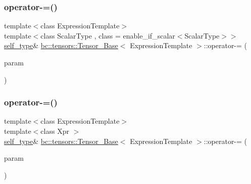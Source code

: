 \mbox{\label{classbc_1_1tensors_1_1Tensor__Base_a6be23674b50827b24c31f65b331ff6af}} 
\subsubsection{\texorpdfstring{operator-\/=()}{operator-=()}\hspace{0.1cm}{\footnotesize\ttfamily [1/2]}}
{\footnotesize\ttfamily template$<$class Expression\+Template$>$ \\
template$<$class Scalar\+Type , class  = enable\+\_\+if\+\_\+scalar$<$\+Scalar\+Type$>$$>$ \\
\hyperlink{classbc_1_1tensors_1_1Expression__Base}{self\+\_\+type}\& \hyperlink{classbc_1_1tensors_1_1Tensor__Base}{bc\+::tensors\+::\+Tensor\+\_\+\+Base}$<$ Expression\+Template $>$\+::operator-\/= (\begin{DoxyParamCaption}\item[{const Scalar\+Type \&}]{param }\end{DoxyParamCaption})\hspace{0.3cm}{\ttfamily [inline]}}

\mbox{\label{classbc_1_1tensors_1_1Tensor__Base_ab20688e90b2046826b3fdbc7b0e6d58e}} 
\subsubsection{\texorpdfstring{operator-\/=()}{operator-=()}\hspace{0.1cm}{\footnotesize\ttfamily [2/2]}}
{\footnotesize\ttfamily template$<$class Expression\+Template$>$ \\
template$<$class Xpr $>$ \\
\hyperlink{classbc_1_1tensors_1_1Expression__Base}{self\+\_\+type}\& \hyperlink{classbc_1_1tensors_1_1Tensor__Base}{bc\+::tensors\+::\+Tensor\+\_\+\+Base}$<$ Expression\+Template $>$\+::operator-\/= (\begin{DoxyParamCaption}\item[{const \hyperlink{classbc_1_1tensors_1_1Expression__Base}{Expression\+\_\+\+Base}$<$ Xpr $>$ \&}]{param }\end{DoxyParamCaption})\hspace{0.3cm}{\ttfamily [inline]}}

